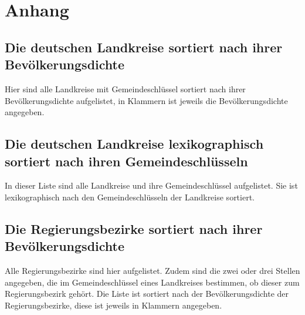 \chapter{Anhang}\label{Anhang}
\section{Die deutschen Landkreise sortiert nach ihrer Bevölkerungsdichte}\label{tab:counties_by_pop_density}
Hier sind alle Landkreise mit Gemeindeschlüssel sortiert nach ihrer Bevölkerungsdichte aufgelistet, in Klammern ist jeweils die Bevölkerungsdichte angegeben.


\newpage
\section{Die deutschen Landkreise lexikographisch sortiert nach ihren Gemeindeschlüsseln}
\label{tab:counties_by_admunitid}
In dieser Liste sind alle Landkreise und ihre Gemeindeschlüssel aufgelistet. Sie ist lexikographisch nach den Gemeindeschlüsseln der Landkreise sortiert.

\newpage
\section{Die Regierungsbezirke sortiert nach ihrer Bevölkerungsdichte}
Alle Regierungsbezirke sind hier aufgelistet. Zudem sind die zwei oder drei Stellen angegeben, die im Gemeindeschlüssel eines Landkreises bestimmen, ob dieser zum Regierungsbezirk gehört. Die Liste ist sortiert nach der Bevölkerungsdichte der Regierungsbezirke, diese ist jeweils in Klammern angegeben.
\label{tab:districts_by_pop_density}

\newpage
